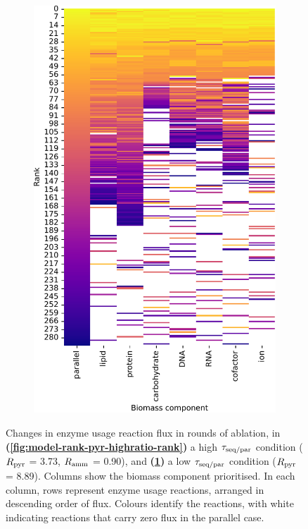 \begin{figure}
  \begin{subfigure}[t]{0.45\textwidth}
  \centering
    \includegraphics[width=\linewidth]{CompareEnzUse_glc00p00_pyr08p89_ammUnres_1.pdf}
    \caption{
    }
    \label{fig:model-rank-pyr-lowratio-rank}
  \end{subfigure}

  \caption{
    Changes in enzyme usage reaction flux in rounds of ablation, in  \textbf{(\ref{fig:model-rank-pyr-highratio-rank})} a high $\tau_{\mathrm{seq}/\mathrm{par}}$ condition ($R_{\mathrm{pyr}}$ = \SI{3.73}{\mmolgdwh}, $R_{\mathrm{amm}}$ = \SI{0.90}{\mmolgdwh}), and \textbf{(\ref{fig:model-rank-pyr-lowratio-rank})} a low $\tau_{\mathrm{seq}/\mathrm{par}}$ condition ($R_{\mathrm{pyr}}$ = \SI{8.89}{\mmolgdwh}).
    Columns show the biomass component prioritised.
    In each column, rows represent enzyme usage reactions, arranged in descending order of flux.
    Colours identify the reactions, with white indicating reactions that carry zero flux in the parallel case.
  }
  \label{fig:model-rank-pyr-rank}
\end{figure}

